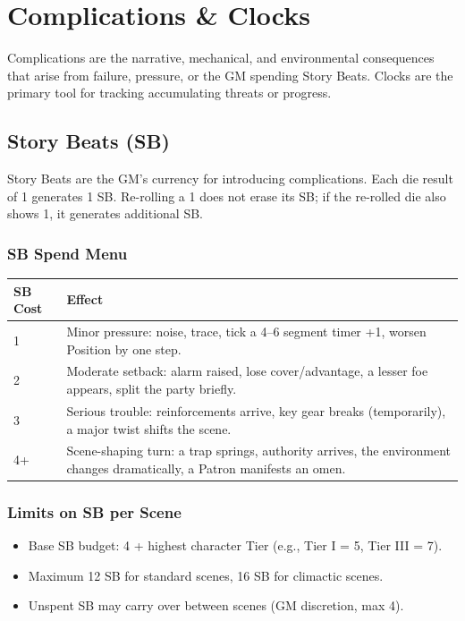 
\section{Complications \& Clocks}

Complications are the narrative, mechanical, and environmental consequences that arise from failure, pressure, or the GM spending Story Beats. Clocks are the primary tool for tracking accumulating threats or progress.

\subsection{Story Beats (SB)}

Story Beats are the GM's currency for introducing complications. Each die result of 1 generates 1 SB. Re-rolling a 1 does not erase its SB; if the re-rolled die also shows 1, it generates additional SB.

\subsubsection{SB Spend Menu}

\begin{tabular}{@{}ll@{}}
\toprule
\textbf{SB Cost} & \textbf{Effect} \\
\midrule
1 & Minor pressure: noise, trace, tick a 4–6 segment timer +1, worsen Position by one step. \\
2 & Moderate setback: alarm raised, lose cover/advantage, a lesser foe appears, split the party briefly. \\
3 & Serious trouble: reinforcements arrive, key gear breaks (temporarily), a major twist shifts the scene. \\
4+ & Scene-shaping turn: a trap springs, authority arrives, the environment changes dramatically, a Patron manifests an omen. \\
\bottomrule
\end{tabular}

\subsubsection{Limits on SB per Scene}
\begin{itemize}
  \item Base SB budget: 4 + highest character Tier (e.g., Tier I = 5, Tier III = 7).
  \item Maximum 12 SB for standard scenes, 16 SB for climactic scenes.
  \item Unspent SB may carry over between scenes (GM discretion, max 4).
\end{itemize}

